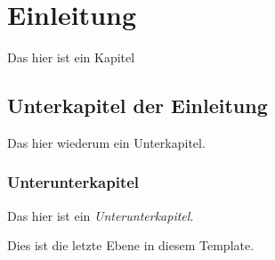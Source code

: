 \section{Einleitung}
\label{sec:einleitung}
Das hier ist ein Kapitel

\subsection{Unterkapitel der Einleitung}
Das hier wiederum ein Unterkapitel.

\subsubsection{Unterunterkapitel}
Das hier ist ein \textit{Unterunterkapitel}.


Dies ist die letzte Ebene in diesem Template.